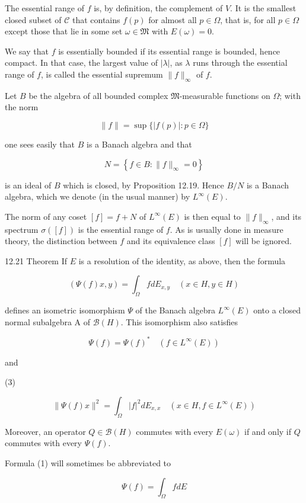 \documentclass[10pt]{article}
\begin{document}
The essential range of $f$ is, by definition, the complement of $V$. It is the smallest closed subset of $\mathscr{C}$ that contains $f(p)$ for almost all $p \in \Omega$, that is, for all $p \in \Omega$ except those that lie in some set $\omega \in \mathfrak{M}$ with $E(\omega)=0$.

We say that $f$ is essentially bounded if its essential range is bounded, hence compact. In that case, the largest value of $|\lambda|$, as $\lambda$ runs through the essential range of $f$, is called the essential supremum $\|f\|_{\infty}$ of $f$.

Let $B$ be the algebra of all bounded complex $\mathfrak{M}$-measurable functions on $\Omega$; with the norm

$$
\|f\|=\sup \{|f(p)|: p \in \Omega\}
$$

one sees easily that $B$ is a Banach algebra and that

$$
N=\left\{f \in B:\|f\|_{\infty}=0\right\}
$$

is an ideal of $B$ which is closed, by Proposition 12.19. Hence $B / N$ is a Banach algebra, which we denote (in the usual manner) by $L^{\infty}(E)$.

The norm of any coset $[f]=f+N$ of $L^{\infty}(E)$ is then equal to $\|f\|_{\infty}$, and its spectrum $\sigma([f])$ is the essential range of $f$. As is usually done in measure theory, the distinction between $f$ and its equivalence class $[f]$ will be ignored.

12.21 Theorem If $E$ is a resolution of the identity, as above, then the formula

$$
(\Psi(f) x, y)=\int_{\Omega} f d E_{x, y} \quad(x \in H, y \in H)
$$

defines an isometric isomorphism $\Psi$ of the Banach algebra $L^{\infty}(E)$ onto a closed normal subalgebra A of $\mathscr{B}(H)$. This isomorphism also satisfies

$$
\Psi(f)=\Psi(f)^{*} \quad\left(f \in L^{\infty}(E)\right)
$$

and

(3)

$$
\|\Psi(f) x\|^{2}=\int_{\Omega}|f|^{2} d E_{x, x} \quad\left(x \in H, f \in L^{\infty}(E)\right)
$$

Moreover, an operator $Q \in \mathscr{B}(H)$ commutes with every $E(\omega)$ if and only if $Q$ commutes with every $\Psi(f)$.

Formula (1) will sometimes be abbreviated to

$$
\Psi(f)=\int_{\Omega} f d E
$$
\end{document}
